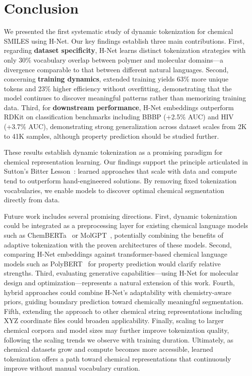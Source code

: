 \documentclass{article}
\newcommand{\hnet}{H-Net}
\begin{document}
\section{Conclusion}
\label{sec:conclusion}

We presented the first systematic study of dynamic tokenization for chemical SMILES using \hnet{}. Our key findings establish three main contributions. First, regarding \textbf{dataset specificity}, \hnet{} learns distinct tokenization strategies with only 30\% vocabulary overlap between polymer and molecular domains---a divergence comparable to that between different natural languages. Second, concerning \textbf{training dynamics}, extended training yields 63\% more unique tokens and 23\% higher efficiency without overfitting, demonstrating that the model continues to discover meaningful patterns rather than memorizing training data. Third, for \textbf{downstream performance}, \hnet{} embeddings outperform RDKit on classification benchmarks including BBBP (+2.5\% AUC) and HIV (+3.7\% AUC), demonstrating strong generalization across dataset scales from 2K to 41K samples, although property prediction should be studied further.

These results establish dynamic tokenization as a promising paradigm for chemical representation learning. Our findings support the principle articulated in Sutton's Bitter Lesson~\citep{sutton2019bitter}: learned approaches that scale with data and compute tend to outperform hand-engineered solutions. By removing fixed tokenization vocabularies, we enable models to discover optimal chemical segmentation directly from data.

Future work includes several promising directions. First, dynamic tokenization could be integrated as a preprocessing layer for existing chemical language models such as ChemBERTa~\citep{chithrananda2020chemberta} or MolGPT~\citep{bagal2021molegpt}, potentially combining the benefits of adaptive tokenization with the proven architectures of these models. Second, comparing \hnet{} embeddings against transformer-based chemical language models such as PolyBERT~\citep{kuenneth2023polybert} for property prediction would clarify relative strengths. Third, evaluating generative capabilities---using \hnet{} for molecular design and optimization---represents a natural extension of this work. Fourth, hybrid approaches could combine \hnet{}'s adaptability with chemistry-aware priors, guiding boundary prediction toward chemically meaningful segmentation. Fifth, extending the approach to other chemical string representations including XYZ coordinate files could broaden applicability. Finally, scaling to larger chemical corpora and model sizes may further improve tokenization quality, following the scaling trends we observe with training duration. Ultimately, as chemical datasets grow and compute becomes more accessible, learned tokenization offers a path toward chemical representations that continuously improve without manual vocabulary curation.
\end{document}
